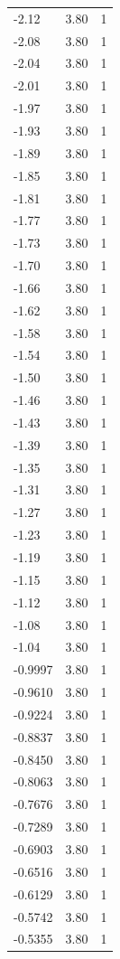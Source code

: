 \begin{longtable}{lrr}
  -2.12 & 3.80 & 1 \\
  -2.08 & 3.80 & 1 \\
  -2.04 & 3.80 & 1 \\
  -2.01 & 3.80 & 1 \\
  -1.97 & 3.80 & 1 \\
  -1.93 & 3.80 & 1 \\
  -1.89 & 3.80 & 1 \\
  -1.85 & 3.80 & 1 \\
  -1.81 & 3.80 & 1 \\
  -1.77 & 3.80 & 1 \\
  -1.73 & 3.80 & 1 \\
  -1.70 & 3.80 & 1 \\
  -1.66 & 3.80 & 1 \\
  -1.62 & 3.80 & 1 \\
  -1.58 & 3.80 & 1 \\
  -1.54 & 3.80 & 1 \\
  -1.50 & 3.80 & 1 \\
  -1.46 & 3.80 & 1 \\
  -1.43 & 3.80 & 1 \\
  -1.39 & 3.80 & 1 \\
  -1.35 & 3.80 & 1 \\
  -1.31 & 3.80 & 1 \\
  -1.27 & 3.80 & 1 \\
  -1.23 & 3.80 & 1 \\
  -1.19 & 3.80 & 1 \\
  -1.15 & 3.80 & 1 \\
  -1.12 & 3.80 & 1 \\
  -1.08 & 3.80 & 1 \\
  -1.04 & 3.80 & 1 \\
  -0.9997 & 3.80 & 1 \\
  -0.9610 & 3.80 & 1 \\
  -0.9224 & 3.80 & 1 \\
  -0.8837 & 3.80 & 1 \\
  -0.8450 & 3.80 & 1 \\
  -0.8063 & 3.80 & 1 \\
  -0.7676 & 3.80 & 1 \\
  -0.7289 & 3.80 & 1 \\
  -0.6903 & 3.80 & 1 \\
  -0.6516 & 3.80 & 1 \\
  -0.6129 & 3.80 & 1 \\
  -0.5742 & 3.80 & 1 \\
  -0.5355 & 3.80 & 1 \\

\end{longtable}
